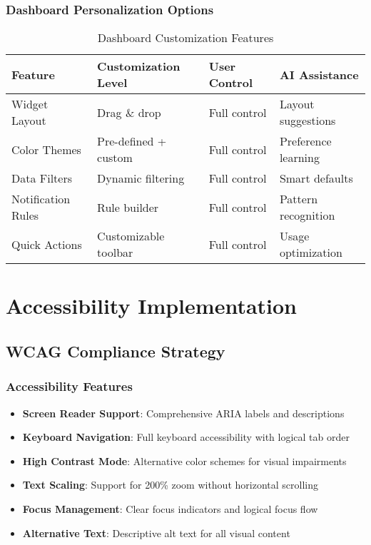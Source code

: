 \subsubsection{Dashboard Personalization Options}

\begin{table}[H]
\centering
\caption{Dashboard Customization Features}
\begin{tabular}{|p{3cm}|p{3cm}|p{3cm}|p{3cm}|}
\hline
\textbf{Feature} & \textbf{Customization Level} & \textbf{User Control} & \textbf{AI Assistance} \\
\hline
Widget Layout & Drag \& drop & Full control & Layout suggestions \\
\hline
Color Themes & Pre-defined + custom & Full control & Preference learning \\
\hline
Data Filters & Dynamic filtering & Full control & Smart defaults \\
\hline
Notification Rules & Rule builder & Full control & Pattern recognition \\
\hline
Quick Actions & Customizable toolbar & Full control & Usage optimization \\
\hline
\end{tabular}
\end{table}

\section{Accessibility Implementation}

\subsection{WCAG Compliance Strategy}

\subsubsection{Accessibility Features}

\begin{itemize}
    \item \textbf{Screen Reader Support}: Comprehensive ARIA labels and descriptions
    \item \textbf{Keyboard Navigation}: Full keyboard accessibility with logical tab order
    \item \textbf{High Contrast Mode}: Alternative color schemes for visual impairments
    \item \textbf{Text Scaling}: Support for 200\% zoom without horizontal scrolling
    \item \textbf{Focus Management}: Clear focus indicators and logical focus flow
    \item \textbf{Alternative Text}: Descriptive alt text for all visual content
\end{itemize}

